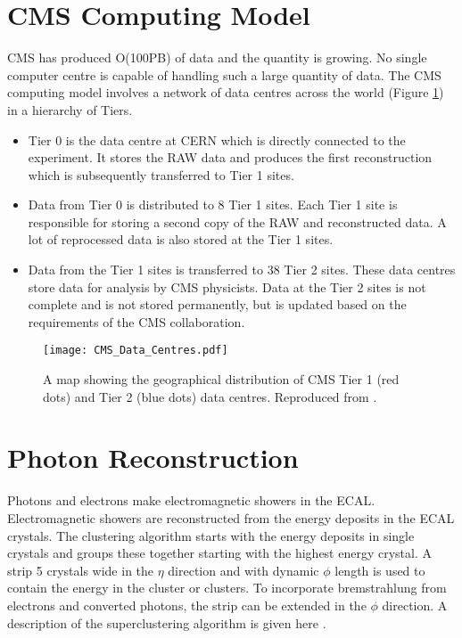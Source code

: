 \section{CMS Computing Model}

CMS has produced O(100PB) of data and the quantity is growing. No single computer
centre is capable of handling such a large quantity of data. The CMS computing
model involves a network of data centres across the world (Figure 
\ref{fig:CMS_Data_Centres}) in a hierarchy of Tiers. 

\begin{itemize}
\item Tier 0 is the data centre at CERN which is directly connected to the
experiment. It stores the RAW data and produces the first reconstruction which
is subsequently transferred to Tier 1 sites. 
\item Data from Tier 0 is distributed to 8 Tier 1 sites. Each Tier 1 site is 
responsible for storing a second copy of the RAW and reconstructed data. A lot 
of reprocessed data is also stored at the Tier 1 sites. 
\item Data from the Tier 1 sites is transferred to 38 Tier 2 sites. These data
centres store data for analysis by CMS physicists. Data at the Tier 2 sites is
not complete and is not stored permanently, but is updated based on the
requirements of the CMS collaboration. 
\end{itemize}

\begin{figure}
\texttt{[image: CMS\_Data\_Centres.pdf]}
\caption{A map showing the geographical distribution of CMS Tier 1 (red dots)
and Tier 2 (blue dots) data centres. Reproduced from \cite{grid}.}
\label{fig:CMS_Data_Centres}
\end{figure}

\section{Photon Reconstruction}
\label{sec:photon_recontruction}

Photons and electrons make electromagnetic showers in the ECAL. Electromagnetic 
showers are reconstructed from the energy deposits in the ECAL crystals. The 
clustering algorithm starts with the energy deposits in single crystals and 
groups these together starting with the highest energy crystal. A strip 5 
crystals wide in the $\eta$ direction and with dynamic $\phi$ length is used to 
contain the energy in the cluster or clusters. To incorporate bremstrahlung from 
electrons and converted photons, the strip can be extended in the $\phi$ 
direction. A description of the superclustering algorithm is given here 
\cite{supercluster}. \\ 

